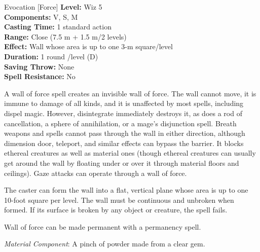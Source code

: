 {Evocation [Force]}
{
	\textbf{Level:}
	Wiz 5\\
	\textbf{Components:}
	V, S, M\\
	\textbf{Casting Time:}
	1 standard action\\
	\textbf{Range:}
	Close (7.5 m + 1.5 m/2 levels)\\
	\textbf{Effect:}
	Wall whose area is up to one 3-m square/level\\
	\textbf{Duration:}
	1 round /level (D)\\
	\textbf{Saving Throw:}
	None\\
	\textbf{Spell Resistance:}
	No\\
}
{
	A wall of force spell creates an invisible wall of force. The wall cannot move, it is immune to damage of all kinds, and it is unaffected by most spells, including dispel magic. However, disintegrate immediately destroys it, as does a rod of cancellation, a sphere of annihilation, or a mage's disjunction spell. Breath weapons and spells cannot pass through the wall in either direction, although dimension door, teleport, and similar effects can bypass the barrier. It blocks ethereal creatures as well as material ones (though ethereal creatures can usually get around the wall by floating under or over it through material floors and ceilings). Gaze attacks can operate through a wall of force.

	The caster can form the wall into a flat, vertical plane whose area is up to one 10-foot square per level. The wall must be continuous and unbroken when formed. If its surface is broken by any object or creature, the spell fails.

	Wall of force can be made permanent with a permanency spell.

	\textit{Material Component}:
	A pinch of powder made from a clear gem.

}
